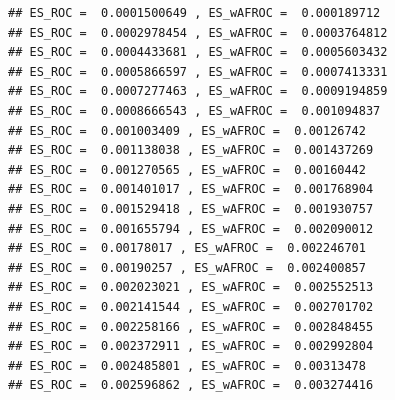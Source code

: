 \documentclass[
]{book}
\newenvironment{Shaded}{\begin{snugshade}}{\end{snugshade}}
\newcommand{\AttributeTok}[1]{\textcolor[rgb]{0.77,0.63,0.00}{#1}}
\newcommand{\CommentTok}[1]{\textcolor[rgb]{0.56,0.35,0.01}{\textit{#1}}}
\newcommand{\ControlFlowTok}[1]{\textcolor[rgb]{0.13,0.29,0.53}{\textbf{#1}}}
\newcommand{\DecValTok}[1]{\textcolor[rgb]{0.00,0.00,0.81}{#1}}
\newcommand{\FloatTok}[1]{\textcolor[rgb]{0.00,0.00,0.81}{#1}}
\newcommand{\FunctionTok}[1]{\textcolor[rgb]{0.00,0.00,0.00}{#1}}
\newcommand{\NormalTok}[1]{#1}
\newcommand{\OtherTok}[1]{\textcolor[rgb]{0.56,0.35,0.01}{#1}}
\newcommand{\SpecialCharTok}[1]{\textcolor[rgb]{0.00,0.00,0.00}{#1}}
\newcommand{\StringTok}[1]{\textcolor[rgb]{0.31,0.60,0.02}{#1}}
\begin{document}
\begin{Shaded}
\end{Shaded}

\begin{verbatim}
## ES_ROC =  0.0001500649 , ES_wAFROC =  0.000189712 
## ES_ROC =  0.0002978454 , ES_wAFROC =  0.0003764812 
## ES_ROC =  0.0004433681 , ES_wAFROC =  0.0005603432 
## ES_ROC =  0.0005866597 , ES_wAFROC =  0.0007413331 
## ES_ROC =  0.0007277463 , ES_wAFROC =  0.0009194859 
## ES_ROC =  0.0008666543 , ES_wAFROC =  0.001094837 
## ES_ROC =  0.001003409 , ES_wAFROC =  0.00126742 
## ES_ROC =  0.001138038 , ES_wAFROC =  0.001437269 
## ES_ROC =  0.001270565 , ES_wAFROC =  0.00160442 
## ES_ROC =  0.001401017 , ES_wAFROC =  0.001768904 
## ES_ROC =  0.001529418 , ES_wAFROC =  0.001930757 
## ES_ROC =  0.001655794 , ES_wAFROC =  0.002090012 
## ES_ROC =  0.00178017 , ES_wAFROC =  0.002246701 
## ES_ROC =  0.00190257 , ES_wAFROC =  0.002400857 
## ES_ROC =  0.002023021 , ES_wAFROC =  0.002552513 
## ES_ROC =  0.002141544 , ES_wAFROC =  0.002701702 
## ES_ROC =  0.002258166 , ES_wAFROC =  0.002848455 
## ES_ROC =  0.002372911 , ES_wAFROC =  0.002992804 
## ES_ROC =  0.002485801 , ES_wAFROC =  0.00313478 
## ES_ROC =  0.002596862 , ES_wAFROC =  0.003274416
\end{verbatim}
\end{document}
